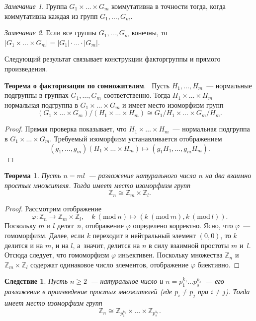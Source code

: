 \documentclass[a4paper,10pt]{amsart}
\def\ZZ{{\mathbb Z}}%
\newtheorem{theorem}{Теорема}
\newtheorem{corollary}{Следствие}
\theoremstyle{definition}
\theoremstyle{remark}
\newtheorem{remark}{Замечание}
\begin{document}
\begin{remark}
Группа $G_1\times\ldots\times G_m$ коммутативна в точности тогда,
когда коммутативна каждая из групп $G_1,\ldots, G_m$.
\end{remark}

\begin{remark}
Если все группы $G_1, \ldots, G_m$ конечны, то $|G_1 \times \ldots
\times G_m| = |G_1| \cdot \ldots \cdot |G_m|$.
\end{remark}

Следующий результат связывает конструкции факторгруппы и прямого
произведения.

{\bf Теорема о факторизации по сомножителям}. \ Пусть $H_1, \ldots,
H_m$~--- нормальные подгруппы в группах $G_1, \ldots, G_m$
соответственно. Тогда $H_1 \times \ldots \times H_m$~--- нормальная
подгруппа в $G_1 \times \ldots \times G_m$ и имеет место изоморфизм
групп
$$
(G_1 \times \ldots \times G_m) / (H_1 \times \ldots \times H_m)
\cong G_1 / H_1 \times \ldots \times G_m / H_m.
$$

\begin{proof}
Прямая проверка показывает, что $H_1\times\ldots\times H_m$~---
нормальная подгруппа в $G_1\times\ldots\times G_m$. Требуемый
изоморфизм устанавливается отображением
$$
(g_1,\ldots,g_m)(H_1\times\ldots\times H_m)\mapsto
(g_1H_1,\ldots,g_mH_m).
$$
\end{proof}

\begin{theorem}
Пусть $n=ml$~--- разложение натурального числа $n$ на два взаимно
простых множителя. Тогда имеет место изоморфизм групп
$$
\ZZ_n\cong \ZZ_m\times\ZZ_l.
$$
\end{theorem}

\begin{proof}
Рассмотрим отображение
$$
\varphi\colon \ZZ_n\to \ZZ_m\times\ZZ_l, \quad k \ (\text{mod}\ n)
\mapsto (k\ (\text{mod}\ m), k\ (\text{mod}\  l)).
$$
Поскольку $m$ и $l$ делят~$n$, отображение $\varphi$ определено
корректно. Ясно, что $\varphi$~--- гомоморфизм. Далее, если $k$
переходит в нейтральный элемент $(0,0)$, то $k$ делится и на $m$, и
на $l$, а~значит, делится на $n$ в силу взаимной простоты $m$ и~$l$.
Отсюда следует, что гомоморфизм $\varphi$ инъективен. Поскольку
множества $\ZZ_n$ и $\ZZ_m\times\ZZ_l$ содержат одинаковое число
элементов, отображение $\varphi$ биективно.
\end{proof}

\begin{corollary} \label{corpr}
Пусть $n \geqslant 2$~--- натуральное число и $n=p_1^{k_1}\ldots
p_s^{k_s}$~--- его разложение в произведение простых множителей
\textup(где $p_i \ne p_j$ при $i \ne j$\textup). Тогда имеет место
изоморфизм групп
$$
\ZZ_n\cong\ZZ_{p_1^{k_1}}\times\ldots\times\ZZ_{p_s^{k_s}}.
$$
\end{corollary}
\end{document}
